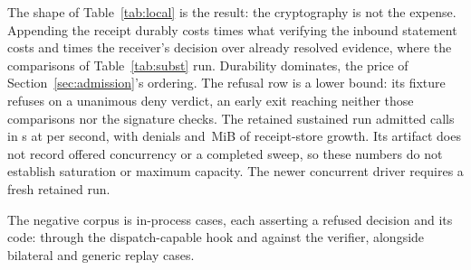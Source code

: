 The shape of Table~\ref{tab:local} is the result: the cryptography is not the
expense. Appending the receipt durably costs
 times what
verifying the inbound statement costs and
 times the
receiver's decision over already resolved evidence, where the comparisons of
Table~\ref{tab:subst} run. Durability dominates, the price of
Section~\ref{sec:admission}'s ordering. The refusal row is a lower bound: its
fixture refuses on a unanimous deny verdict, an early exit reaching neither
those comparisons nor the signature checks. The retained sustained run admitted
\PSSustainedCalls{} calls in \PSSustainedSeconds{} s at
\PSSustainedCallsPerSecond{} per second, with \PSSustainedDenials{} denials
and \,MiB of
receipt-store growth. Its artifact does not record offered concurrency or a
completed sweep, so these numbers do not establish saturation or maximum
capacity. The newer concurrent driver requires a fresh retained run.

The negative corpus is \PSThreatCaseCount{} in-process cases, each asserting a
refused decision and its code: \PSThreatDispatchCaseCount{} through the
dispatch-capable hook and \PSThreatVerifierCaseCount{} against the verifier,
alongside \PSBilateralReplayCases{} bilateral and \PSGenericReplayCases{}
generic replay cases.


